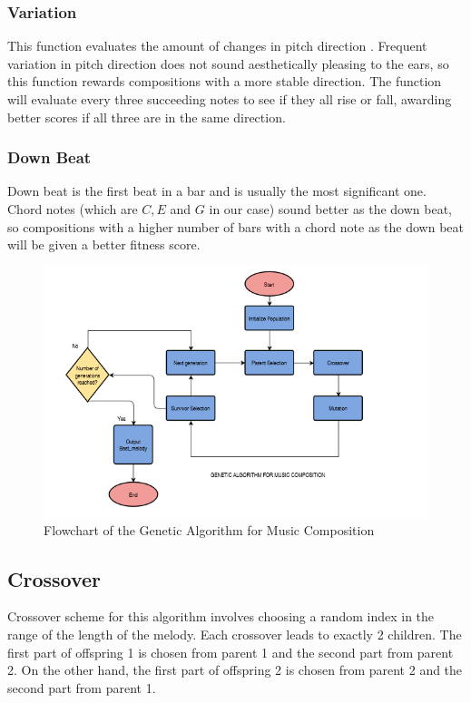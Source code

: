\documentclass[conference]{IEEEtran}
\begin{document}
\subsubsection{Variation}
This function evaluates the amount of changes in pitch direction \cite{b2}. Frequent variation in pitch direction does not sound aesthetically pleasing to the ears, so this function rewards compositions with a more stable direction. The function will evaluate every three succeeding notes to see if they all rise or fall, awarding better scores if all three are in the same direction.

\subsubsection{Down Beat}
Down beat is the first beat in a bar and is usually the most significant one. Chord notes (which are $C, E$ and $G$ in our case) sound better as the down beat, so compositions with a higher number of bars with a chord note as the down beat will be given a better fitness score.

\begin{figure}
\includegraphics[width=10 cm, height= 10 cm ]{Flowchart.png}
\caption{ Flowchart of the Genetic Algorithm for Music Composition}
\end{figure}

\subsection{Crossover}
Crossover scheme for this algorithm involves choosing a random index in the range of the length of the melody. Each crossover leads to exactly 2 children. The first part of offspring 1 is chosen from parent 1 and the second part from parent 2. On the other hand, the first part of offspring 2 is chosen from parent 2 and the second part from parent 1.
\end{document}
